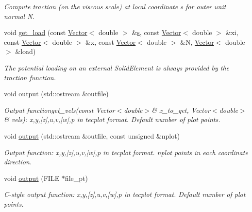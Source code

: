 \begin{DoxyCompactItemize}
\begin{DoxyCompactList}\small\item\em Compute traction (on the viscous scale) at local coordinate s for outer unit normal N. \end{DoxyCompactList}\item 
void \hyperlink{classoomph_1_1PolarNavierStokesEquations_a47ae24dc603a7d46bd4a85ccfb2b8e23}{get\+\_\+load} (const \hyperlink{classoomph_1_1Vector}{Vector}$<$ double $>$ \&\hyperlink{cfortran_8h_ab7123126e4885ef647dd9c6e3807a21c}{s}, const \hyperlink{classoomph_1_1Vector}{Vector}$<$ double $>$ \&xi, const \hyperlink{classoomph_1_1Vector}{Vector}$<$ double $>$ \&x, const \hyperlink{classoomph_1_1Vector}{Vector}$<$ double $>$ \&N, \hyperlink{classoomph_1_1Vector}{Vector}$<$ double $>$ \&load)
\begin{DoxyCompactList}\small\item\em The potential loading on an external Solid\+Element is always provided by the traction function. \end{DoxyCompactList}\item 
void \hyperlink{classoomph_1_1PolarNavierStokesEquations_a720f9b13abd3bf876793f1f9e8538f61}{output} (std\+::ostream \&outfile)
\begin{DoxyCompactList}\small\item\em Output functionget\+\_\+vels(const Vector$<$double$>$\& x\+\_\+to\+\_\+get, Vector$<$double$>$\& vels)\+: x,y,\mbox{[}z\mbox{]},u,v,\mbox{[}w\mbox{]},p in tecplot format. Default number of plot points. \end{DoxyCompactList}\item 
void \hyperlink{classoomph_1_1PolarNavierStokesEquations_a830bb7a0fc6532994fd1e173f7803d54}{output} (std\+::ostream \&outfile, const unsigned \&nplot)
\begin{DoxyCompactList}\small\item\em Output function\+: x,y,\mbox{[}z\mbox{]},u,v,\mbox{[}w\mbox{]},p in tecplot format. nplot points in each coordinate direction. \end{DoxyCompactList}\item 
void \hyperlink{classoomph_1_1PolarNavierStokesEquations_aad582ad191d1dd67ee148495ee46778e}{output} (F\+I\+LE $\ast$file\+\_\+pt)
\begin{DoxyCompactList}\small\item\em C-\/style output function\+: x,y,\mbox{[}z\mbox{]},u,v,\mbox{[}w\mbox{]},p in tecplot format. Default number of plot points. \end{DoxyCompactList}\item 

\end{DoxyCompactItemize}
